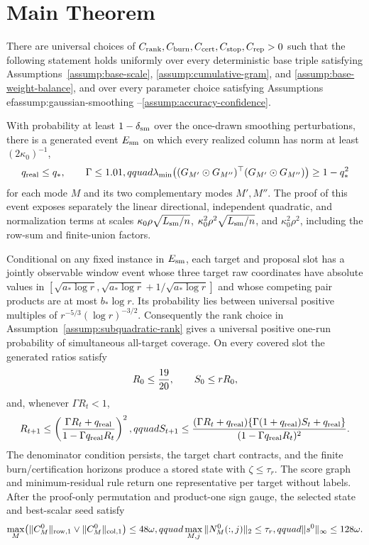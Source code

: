 \section{Main Theorem}\label{sec:main}

\begin{theorem}
\label{thm:main}
There are universal choices of
$C_{\rm rank},C_{\rm burn},C_{\rm cert},C_{\rm stop},C_{\rm rep}>0$ such
that the following statement holds uniformly over every deterministic base
triple satisfying Assumptions~\ref{assump:base-scale},
\ref{assump:cumulative-gram}, and \ref{assump:base-weight-balance}, and
over every parameter choice satisfying Assumptions~
ef{assump:gaussian-smoothing}
--\ref{assump:accuracy-confidence}.

With probability at least $1-\delta_{\rm sm}$ over the once-drawn smoothing
perturbations, there is a generated event $E_{\rm sm}$ on which every realized
column has norm at least $(2\kappa _0)^{-1}$,
\[
 q_{\rm real}\le q_*,\qquad \Gamma\le1.01,qquad
 \lambda_{\min}\bigl((G_{M'}\odot G_{M''})^\top
 (G_{M'}\odot G_{M''})\bigr)\ge1-q_*^2
\]
for each mode $M$ and its two complementary modes $M',M''$.  The proof of
this event exposes separately the linear directional, independent quadratic,
and normalization terms at scales
$\kappa _0\rho\sqrt{L_{\rm sm}/n}$,
$\kappa _0^2\rho^2\sqrt{L_{\rm sm}/n}$, and
$\kappa _0^2\rho^2$, including the row-sum and finite-union factors.

Conditional on any fixed instance in $E_{\rm sm}$, each target and proposal
slot has a jointly observable window event whose three target raw
coordinates have absolute values in
$[\sqrt{a_*\log r},\sqrt{a_*\log r}+1/\sqrt{a_*\log r}]$ and whose
competing pair products are at most $b_*\log r$.  Its probability lies
between universal positive multiples of
$r^{-5/3}(\log r)^{-3/2}$.  Consequently the rank choice in
Assumption~\ref{assump:subquadratic-rank} gives a universal positive
one-run probability of simultaneous all-target coverage.  On every covered
slot the generated ratios satisfy
\[
 R_0\le {19\over20},\qquad S_0\le rR_0,
\]
and, whenever $\Gamma R_t<1$,
\[
 R_{t+1}\le\left({\Gamma R_t+q_{\rm real}\over
 1-\Gamma q_{\rm real}R_t}\right)^2,qquad
 S_{t+1}\le { (\Gamma R_t+q_{\rm real})
 \{\Gamma(1+q_{\rm real})S_t+q_{\rm real}\}\over
 (1-\Gamma q_{\rm real}R_t)^2}.
\]
The denominator condition persists, the target chart contracts, and the
finite burn/certification horizons produce a stored state with
$\zeta\le\tau_r$.  The score graph and minimum-residual rule return one
representative per target without labels.  After the proof-only permutation
and product-one sign gauge, the selected state and best-scalar seed satisfy
\[
 \max_M\bigl(\|C_M^0\|_{\rm row,1}\vee
 \|C_M^0\|_{\rm col,1}\bigr)\le48\omega,qquad
 \max_{M,j}\|N_M^0(:,j)\|_2\le\tau_r,qquad
 \|s^0\|_\infty\le128\omega.
\]


\end{theorem}

